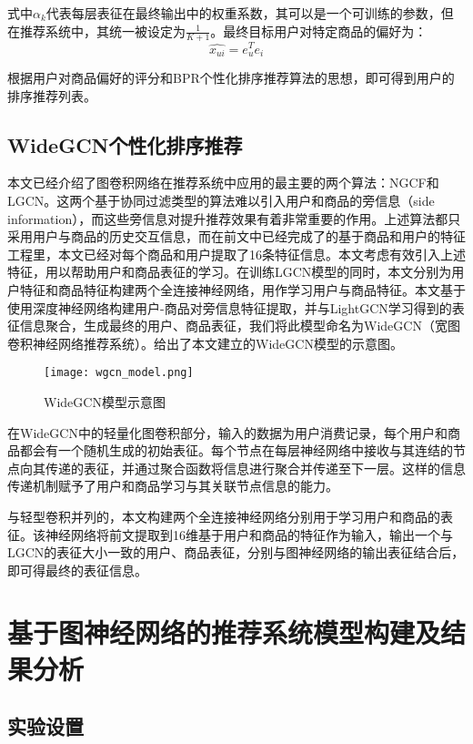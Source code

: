 \documentclass[lang=cn,11pt,a4paper,cite=authoryear]{elegantpaper}
\begin{document}
式中$\alpha_k$代表每层表征在最终输出中的权重系数，其可以是一个可训练的参数，但在推荐系统中，其统一被设定为$\frac{1}{K+1}$。最终目标用户对特定商品的偏好为：
\begin{equation}
  \hat{x_{ui}} = e_u^Te_i
\end{equation}

根据用户对商品偏好的评分和BPR个性化排序推荐算法的思想，即可得到用户的排序推荐列表。

\subsection{WideGCN个性化排序推荐}
本文已经介绍了图卷积网络在推荐系统中应用的最主要的两个算法：NGCF和LGCN。这两个基于协同过滤类型的算法难以引入用户和商品的旁信息（side information），而这些旁信息对提升推荐效果有着非常重要的作用。上述算法都只采用用户与商品的历史交互信息，而在前文中已经完成了的基于商品和用户的特征工程里，本文已经对每个商品和用户提取了16条特征信息。本文考虑有效引入上述特征，用以帮助用户和商品表征的学习。在训练LGCN模型的同时，本文分别为用户特征和商品特征构建两个全连接神经网络，用作学习用户与商品特征。本文基于使用深度神经网络构建用户-商品对旁信息特征提取，并与LightGCN学习得到的表征信息聚合，生成最终的用户、商品表征，我们将此模型命名为WideGCN（宽图卷积神经网络推荐系统）。给出了本文建立的WideGCN模型的示意图。
\begin{figure}[H]
  \centering
  \texttt{[image: wgcn\_model.png]}
  \caption{WideGCN模型示意图}
  \label{wgcn图}
\end{figure}

在WideGCN中的轻量化图卷积部分，输入的数据为用户消费记录，每个用户和商品都会有一个随机生成的初始表征。每个节点在每层神经网络中接收与其连结的节点向其传递的表征，并通过聚合函数将信息进行聚合并传递至下一层。这样的信息传递机制赋予了用户和商品学习与其关联节点信息的能力。

与轻型卷积并列的，本文构建两个全连接神经网络分别用于学习用户和商品的表征。该神经网络将前文提取到16维基于用户和商品的特征作为输入，输出一个与LGCN的表征大小一致的用户、商品表征，分别与图神经网络的输出表征结合后，即可得最终的表征信息。

\section{基于图神经网络的推荐系统模型构建及结果分析}
\subsection{实验设置}
\end{document}

